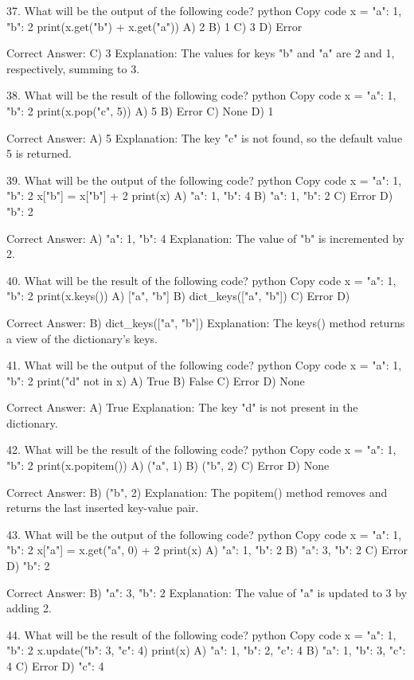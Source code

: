 37. What will be the output of the following code?
python
Copy code
x = {"a": 1, "b": 2}
print(x.get("b") + x.get("a"))
A) 2
B) 1
C) 3
D) Error

Correct Answer: C) 3
Explanation: The values for keys "b" and "a" are 2 and 1, respectively, summing to 3.

38. What will be the result of the following code?
python
Copy code
x = {"a": 1, "b": 2}
print(x.pop("c", 5))
A) 5
B) Error
C) None
D) 1

Correct Answer: A) 5
Explanation: The key "c" is not found, so the default value 5 is returned.

39. What will be the output of the following code?
python
Copy code
x = {"a": 1, "b": 2}
x["b"] = x["b"] + 2
print(x)
A) {"a": 1, "b": 4}
B) {"a": 1, "b": 2}
C) Error
D) {"b": 2}

Correct Answer: A) {"a": 1, "b": 4}
Explanation: The value of "b" is incremented by 2.

40. What will be the result of the following code?
python
Copy code
x = {"a": 1, "b": 2}
print(x.keys())
A) ["a", "b"]
B) dict_keys(["a", "b"])
C) Error
D) {}

Correct Answer: B) dict_keys(["a", "b"])
Explanation: The keys() method returns a view of the dictionary's keys.

41. What will be the output of the following code?
python
Copy code
x = {"a": 1, "b": 2}
print("d" not in x)
A) True
B) False
C) Error
D) None

Correct Answer: A) True
Explanation: The key "d" is not present in the dictionary.

42. What will be the result of the following code?
python
Copy code
x = {"a": 1, "b": 2}
print(x.popitem())
A) ("a", 1)
B) ("b", 2)
C) Error
D) None

Correct Answer: B) ("b", 2)
Explanation: The popitem() method removes and returns the last inserted key-value pair.

43. What will be the output of the following code?
python
Copy code
x = {"a": 1, "b": 2}
x["a"] = x.get("a", 0) + 2
print(x)
A) {"a": 1, "b": 2}
B) {"a": 3, "b": 2}
C) Error
D) {"b": 2}

Correct Answer: B) {"a": 3, "b": 2}
Explanation: The value of "a" is updated to 3 by adding 2.

44. What will be the result of the following code?
python
Copy code
x = {"a": 1, "b": 2}
x.update({"b": 3, "c": 4})
print(x)
A) {"a": 1, "b": 2, "c": 4}
B) {"a": 1, "b": 3, "c": 4}
C) Error
D) {"c": 4}


